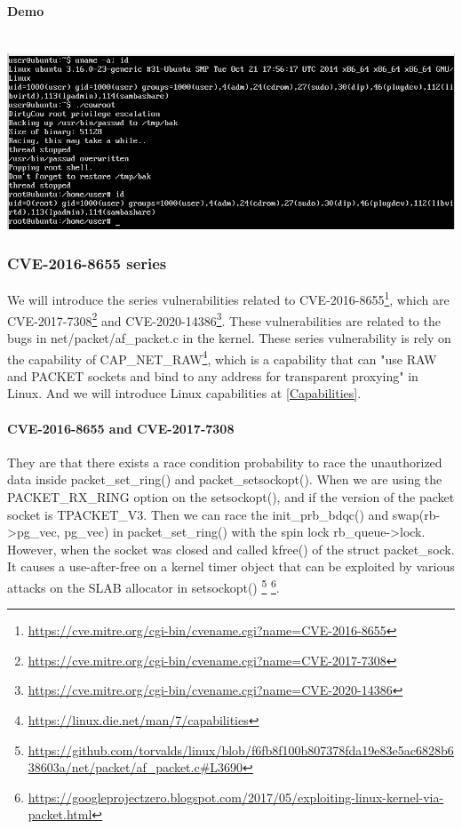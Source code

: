 \paragraph{Demo}\mbox{}\\
\includegraphics[width=\textwidth]{src/Screenshot_2021-12-26_05-14-58.png}
\label{qemumachine}

\subsubsection{CVE-2016-8655 series}
We will introduce the series vulnerabilities related to CVE-2016-8655\footnote{
    \url{https://cve.mitre.org/cgi-bin/cvename.cgi?name=CVE-2016-8655}}, which are
CVE-2017-7308\footnote{\url{https://cve.mitre.org/cgi-bin/cvename.cgi?name=CVE-2017-7308}}
and CVE-2020-14386\footnote{\url{https://cve.mitre.org/cgi-bin/cvename.cgi?name=CVE-2020-14386}}.
These vulnerabilities are related to the bugs in net/packet/af\_packet.c in the kernel.
These series vulnerability is rely on the capability of CAP\_NET\_RAW\footnote{\url{https://linux.die.net/man/7/capabilities}},
which is a capability that can "use RAW and PACKET sockets and bind to
any address for transparent proxying" in Linux. And we will introduce Linux
capabilities at \ref{Capabilities}.

\paragraph{CVE-2016-8655 and CVE-2017-7308} They are that there exists a race condition probability to
race the unauthorized data inside packet\_set\_ring() and packet\_setsockopt().
When we are using the PACKET\_RX\_RING option on the setsockopt(), and if the
version of the packet socket is TPACKET\_V3. Then we can race the init\_prb\_bdqc()
and swap(rb->pg\_vec, pg\_vec) in packet\_set\_ring() with the spin lock rb\_queue->lock.
However, when the socket was closed and called kfree() of the struct packet\_sock.
It causes a use-after-free on a kernel timer object that can be exploited
by various attacks on the SLAB allocator in setsockopt()
\footnote{\url{https://github.com/torvalds/linux/blob/f6fb8f100b807378fda19e83e5ac6828b638603a/net/packet/af\_packet.c\#L3690}}
\footnote{\url{https://googleprojectzero.blogspot.com/2017/05/exploiting-linux-kernel-via-packet.html}}.

